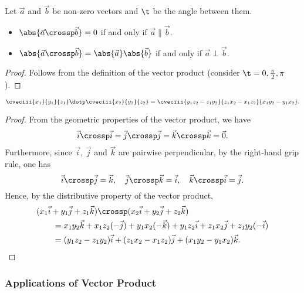 \begin{proposition}
    Let $\vec a$ and $\vec b$ be non-zero vectors and $\t$ be the angle between them.
    \begin{itemize}
        \item $\abs{\vec a \crossp \vec b} = 0$ if and only if $\vec a \parallel \vec b$.
        \item $\abs{\vec a \crossp \vec b} = \abs{\vec a} \abs{\vec b}$ if and only if $\vec a \perp \vec b$.
    \end{itemize}
\end{proposition}
\begin{proof}
    Follows from the definition of the vector product (consider $\t = 0, \frac\pi2, \pi$).
\end{proof}

\begin{proposition}
    \[\cveciii{x_1}{y_1}{z_1} \dotp \cveciii{x_2}{y_2}{z_2} = \cveciii{y_1 z_2 - z_1 y_2}{z_1 x_2 - x_1 z_2}{x_1 y_2 - y_1 x_2}.\]
\end{proposition}
\begin{proof}
    From the geometric properties of the vector product, we have \[\vec i \crossp \vec i = \vec j \crossp \vec j = \vec k \crossp \vec k = \vec 0.\] Furthermore, since $\vec i$, $\vec j$ and $\vec k$ are pairwise perpendicular, by the right-hand grip rule, one has \[\vec i \crossp \vec j = \vec k, \quad \vec j \crossp \vec k = \vec i, \quad \vec k \crossp \vec i = \vec j.\] Hence, by the distributive property of the vector product,
    \begin{align*}
        &(x_1 \vec i + y_1 \vec j + z_1 \vec k) \crossp (x_2 \vec i + y_2 \vec j + z_2 \vec k) \\
        &\hspace{2em}= x_1 y_2 \vec k + x_1 z_2 (-\vec j) + y_1 x_2 (-\vec k) + y_1 z_2 \vec i + z_1 x_2 \vec j + z_1 y_2 (-\vec i) \\
        &\hspace{2em}=(y_1 z_2 - z_1 y_2) \vec i + (z_1 x_2 - x_1 z_2) \vec j + (x_1 y_2 - y_1 x_2) \vec k.
    \end{align*}
\end{proof}

\subsubsection{Applications of Vector Product}

